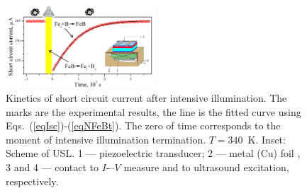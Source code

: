 \documentclass[%
 aip,jap,
 amsmath,amssymb,
 reprint,%
]{revtex4-1}
\begin{document}
\begin{figure}
\includegraphics[width=0.5\textwidth]{Fig2}%
\caption{\label{Fig:Method}
Kinetics of short circuit current after intensive illumination.
The marks are the experimental results,
the line is the fitted curve using Eqs.~(\ref{eqIsc})-(\ref{eqNFeBt}).
The zero of time corresponds to the moment of intensive illumination termination.
$T=340$~K.
Inset: Scheme of USL.
1 –-- piezoelectric transducer;
2 –-- metal (Cu) foil ,
3 and 4 --- contact to $I$-–$V$ measure and to ultrasound excitation, respectively.
}
\end{figure}
\end{document}
